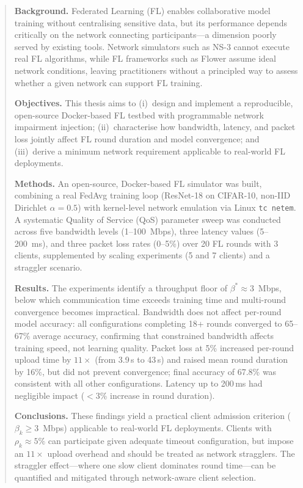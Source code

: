 \documentclass[12pt,a4paper]{report}
\begin{document}
\begin{abstract}

\noindent\textbf{Background.}
Federated Learning (FL) enables collaborative model training without
centralising sensitive data, but its performance depends critically on
the network connecting participants---a dimension poorly served by
existing tools.  Network simulators such as NS-3 cannot execute real FL
algorithms, while FL frameworks such as Flower assume ideal network
conditions, leaving practitioners without a principled way to assess
whether a given network can support FL training.

\medskip
\noindent\textbf{Objectives.}
This thesis aims to (i)~design and implement a reproducible, open-source
Docker-based FL testbed with programmable network impairment injection;
(ii)~characterise how bandwidth, latency, and packet loss jointly affect
FL round duration and model convergence; and (iii)~derive a minimum
network requirement applicable to real-world FL deployments.

\medskip
\noindent\textbf{Methods.}
An open-source, Docker-based FL simulator was built, combining a real
FedAvg training loop (ResNet-18 on CIFAR-10, non-IID Dirichlet
$\alpha = 0.5$) with kernel-level network emulation via Linux
\texttt{tc netem}.  A systematic Quality of Service (QoS) parameter sweep
was conducted across five bandwidth levels (1--100~Mbps), three latency
values (5--200~ms), and three packet loss rates (0--5\%) over 20 FL
rounds with 3 clients, supplemented by scaling experiments (5 and 7
clients) and a straggler scenario.

\medskip
\noindent\textbf{Results.}
The experiments identify a throughput floor of $\beta^* \approx 3$~Mbps,
below which communication time exceeds training time and multi-round
convergence becomes impractical.  Bandwidth does not affect per-round
model accuracy: all configurations completing 18+ rounds converged to
65--67\% average accuracy, confirming that constrained bandwidth affects
training speed, not learning quality.  Packet loss at 5\% increased per-round upload time by $11\times$
(from 3.9\,s to 43\,s) and raised mean round duration by 16\%, but did
not prevent convergence; final accuracy of 67.8\% was consistent with
all other configurations.  Latency up to 200\,ms had negligible impact
($<$3\% increase in round duration).

\medskip
\noindent\textbf{Conclusions.}
These findings yield a practical client admission criterion
($\beta_k \geq 3$~Mbps) applicable to real-world FL deployments.
Clients with $\rho_k \approx 5\%$ can participate given adequate timeout
configuration, but impose an $11\times$ upload overhead and should be
treated as network stragglers.  The straggler effect---where one slow
client dominates round time---can be quantified and mitigated through
network-aware client selection.

\end{abstract}
\end{document}
